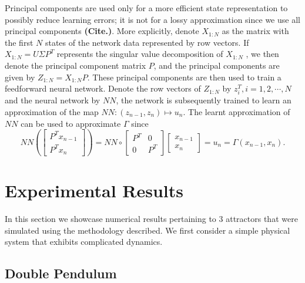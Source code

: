 Principal components are used only for a more efficient state representation to possibly reduce learning errors; it is not for a lossy approximation since we use all principal components \textbf{(Cite.)}.
More explicitly, denote $X_{1:N}$ as the matrix with the first $N$ states of the network data represented by row vectors. If $X_{1:N}=U\Sigma P^T$ represents the singular value decomposition of $X_{1:N}$ , we then denote the principal component matrix $P$, and the principal components are given by 
 $Z_{1:N}=X_{1:N}P.$
These principal components are then used to train a feedforward neural network. Denote the row vectors of $Z_{1:N}$ by 
$z_i^T, i=1,2,\cdots,N$ and the neural network by $NN$, the network is subsequently trained to learn an approximation of the map
$NN: (z_{n-1},z_n) \mapsto  u_n.
$
The learnt approximation of $NN$ can be used to approximate $\Gamma$ since 
$$
NN\left( \begin{bmatrix} 
P^Tx_{n-1} \\
P^Tx_n
\end{bmatrix}
\right) = NN \circ 
\begin{bmatrix}
P^T & 0 \\
0 & P^T 
\end{bmatrix}\begin{bmatrix}
x_{n-1}\\
x_n
\end{bmatrix} = u_n = \Gamma(x_{n-1},x_n).
$$


\section{Experimental Results}
In this section we showcase numerical results pertaining to 3 attractors that were simulated using the methodology described. We first consider a simple physical system that exhibits complicated dynamics.
\subsection{Double Pendulum}


